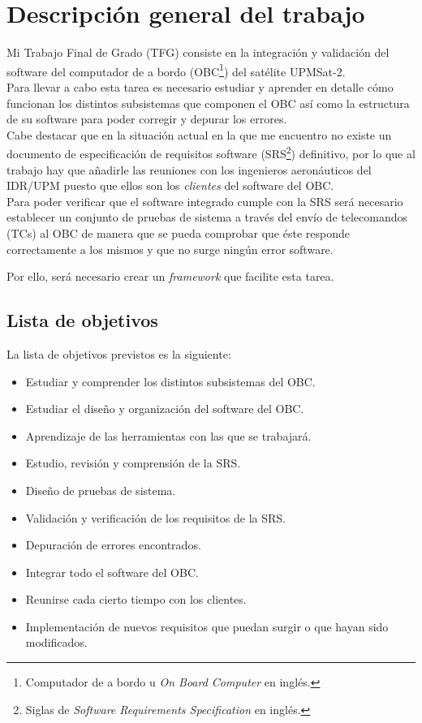
\section{Descripción general del trabajo}
Mi Trabajo Final de Grado (TFG) consiste en la integración y validación del
software del computador de a bordo (OBC\footnote{Computador de a bordo u
  \textit{On Board Computer} en inglés.}) del satélite UPMSat-2.\\

  Para llevar a cabo esta tarea es necesario estudiar y aprender en detalle cómo
  funcionan los distintos subsistemas que componen el OBC así como la estructura
  de su software para poder corregir y depurar los errores.\\

  Cabe destacar que en la situación actual en la que me encuentro no existe un
  documento de especificación de requisitos software (SRS\footnote{Siglas de
    \textit{Software Requirements Specification} en inglés.}) definitivo, por lo
  que al trabajo hay que añadirle las reuniones con los ingenieros aeronáuticos
  del IDR/UPM puesto que ellos son los \textit{clientes} del software del OBC.\\

  Para poder verificar que el software integrado cumple con la SRS será
  necesario establecer un conjunto de pruebas de sistema a través del envío
  de telecomandos (TCs) al OBC de manera que se pueda comprobar que éste
  responde correctamente a los mismos y que no surge ningún error software.

  Por ello, será necesario crear un \textit{framework} que facilite esta tarea.\\

  \subsection{Lista de objetivos}
  La lista de objetivos previstos es la siguiente:
  \begin{itemize}
  \item Estudiar y comprender los distintos subsistemas del OBC.
  \item Estudiar el diseño y organización del software del OBC.
  \item Aprendizaje de las herramientas con las que se trabajará.
  \item Estudio, revisión y comprensión de la SRS.
  \item Diseño de pruebas de sistema.
  \item Validación y verificación de los requisitos de la SRS.
  \item Depuración de errores encontrados.
  \item Integrar todo el software del OBC.
  \item Reunirse cada cierto tiempo con los clientes.
  \item Implementación de nuevos requisitos que puedan surgir o que hayan sido
    modificados.
  \end{itemize}